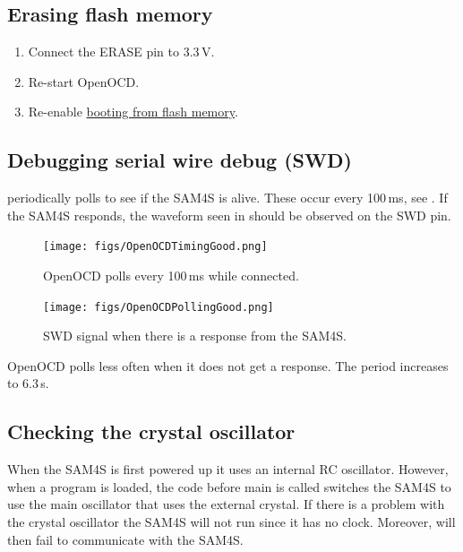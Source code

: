 \subsection{Erasing flash memory}
\label{erasing-flash-memory}

\begin{enumerate}
\item Connect the ERASE pin to 3.3\,V.

\item Re-start OpenOCD.

\item Re-enable \hyperref[booting-from-flash-memory]{booting from
  flash memory}.
\end{enumerate}


\subsection{Debugging serial wire debug (SWD)}
\label{debugging-serial-wire-debug-swd}

 periodically polls to see if the SAM4S is alive.
These occur every 100\,ms, see .  If the SAM4S
responds, the waveform seen in  should be
observed on the SWD pin.

\begin{figure}[!h]
\centering
\texttt{[image: figs/OpenOCDTimingGood.png]}
\caption{OpenOCD polls every 100\,ms while connected.}
\label{fig:openocd-poll}
\end{figure}

\begin{figure}[!h]
\centering
\texttt{[image: figs/OpenOCDPollingGood.png]}
\caption{SWD signal when there is a response from the SAM4S.}
\label{fig:openocd-response}
\end{figure}



OpenOCD polls less often when it does not get a response. The period
increases to 6.3\,s.

\subsection{Checking the crystal oscillator}
\label{checking-the-crystal-oscillator}

When the SAM4S is first powered up it uses an internal RC oscillator.
However, when a program is loaded, the code before main is called
switches the SAM4S to use the main oscillator that uses the external
crystal.  If there is a problem with the crystal oscillator the SAM4S
will not run since it has no clock.  Moreover,  will
then fail to communicate with the SAM4S.

